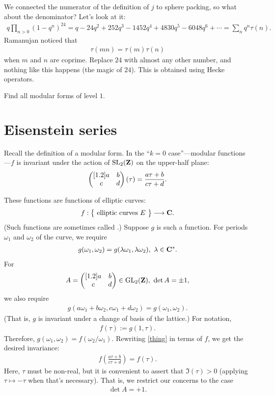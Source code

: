 \documentclass[11pt, oneside,margin=1in]{article}
\begin{document}
We connected the numerator of the definition of $j$ to sphere packing, so what about the denominator? Let's look at it:
\begin{align*}
	q \prod_{n>0} (1-q^n)^{24} = q - 24q^2 + 252q^3 - 1452q^4 + 4830q^5 - 6048q^6 + \cdots = \sum_{n}^{} q^n\tau(n).
\end{align*}
Ramanujan noticed that 
\begin{align*}
	\tau(mn) = \tau (m)\tau (n)
\end{align*}
when $m$ and $n$ are coprime. Replace $24$ with almost any other number, and nothing like this happens (the magic of $24$). This is obtained using Hecke operators. 
\begin{problem}
	Find all modular forms of level $1$.
\end{problem}


\section{Eisenstein series}
Recall the definition of a modular form. In the ``$k=0$ case''---modular functions---$f$ is invariant under the action of $\operatorname{SL}_{2}(\mathbf{Z})$ on the upper-half plane:
\begin{align*}
	\begin{pmatrix} [ 1.2 ] a&b\\c&d\end{pmatrix} (\tau) =  \frac{a\tau + b}{c\tau + d}.
\end{align*}

These functions are functions of elliptic curves:
\begin{align*}
	f : \big\{\ \textrm{elliptic curves $E$}\ \big\} \longrightarrow \mathbf C.
\end{align*}
(Such functions are sometimes called .) Suppose $g$ is such a function. For periods $\omega_1$ and $\omega_2$ of the curve, we require
\begin{align*}
	g(\omega_1,\omega_2) = g(\lambda\omega_1,\lambda\omega_2),\ \lambda\in \C^*.
\end{align*}
For 
\begin{align*}
A=	\begin{pmatrix} [ 1.2 ] a&b\\c&d\end{pmatrix} \in \operatorname{GL}_{2}(\mathbf Z),\ \det A = \pm 1, 
\end{align*}
we also require
\begin{align}\label{thing}
	g(a\omega_1+b\omega_2, c\omega_1+d\omega_2) = g(\omega_1,\omega_2).
\end{align}
(That is, $g$ is invariant under a change of basis of the lattice.) For notation,
 \begin{align*}
	f(\tau) := g (1,\tau).
\end{align*}
Therefore, $g(\omega_1,\omega_2) = f(\omega_2/\omega_1)$. Rewriting \cref{thing} in terms of $f$, we get the desired invariance:
\begin{align*}
	f\left( \frac{a\tau + b}{c\tau +d} \right) = f(\tau).
\end{align*}
Here, $\tau$ must be non-real, but it is convenient to assert that $\Im(\tau) > 0$ (applying $\tau\longmapsto -\tau$ when that's necessary). That is, we restrict our concerns to the case
\begin{align*}
	\det A = +1.
\end{align*}
\end{document}

